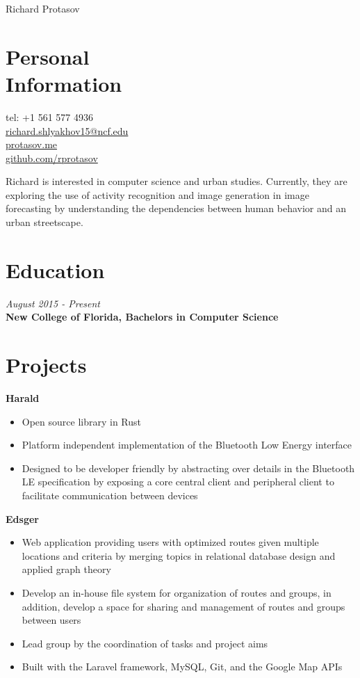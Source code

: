 \documentclass[margin,line,a4paper]{resume}
\begin{document}
{\sc \Huge Richard Protasov}
\begin{resume}
    \vspace{0.5cm}

    \section{\mysidestyle Personal\\Information}%
    tel: +1 561 577 4936 \\
    \href{mailto:richard.shlyakhov15@ncf.edu}{richard.shlyakhov15@ncf.edu} \\
    \href{https://protasov.me}{protasov.me}\\
    \href{https://github.com/rprotasov}{github.com/rprotasov}
     
     Richard is interested in computer science and urban studies. Currently, they are exploring the use of activity recognition and image generation in image forecasting by understanding the dependencies between human behavior and an urban streetscape.
    
    \section{\mysidestyle Education}
        \textit{August 2015 - Present}\\
        \textbf{New College of Florida, Bachelors in Computer Science}
        
    \section{\mysidestyle Projects}
        \textbf{Harald}
        \begin{itemize}
            \item Open source library in Rust
            \item Platform independent implementation of the Bluetooth Low Energy interface
            \item Designed to be developer friendly by abstracting over details in the Bluetooth LE specification by exposing a core central client and peripheral client to facilitate communication between devices
        \end{itemize}
        
        \textbf{Edsger}
        \begin{itemize}
            \item Web application providing users with optimized routes given multiple locations and criteria by merging topics in relational database design and applied graph theory
            \item Develop an in-house file system for organization of routes and groups, in addition, develop a space for sharing and management of routes and groups between users
            \item Lead group by the coordination of tasks and project aims
            \item Built with the Laravel framework, MySQL, Git, and the Google Map APIs
        \end{itemize}
    

\end{resume}
\end{document}
